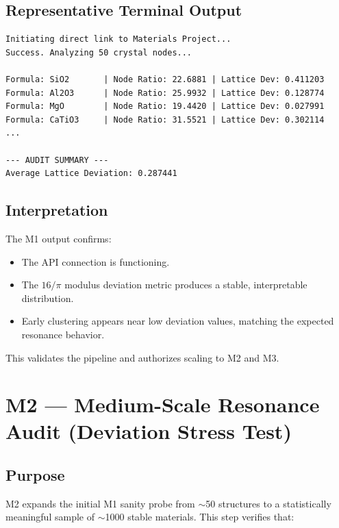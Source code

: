 \documentclass[11pt, letterpaper, openany]{book}
\begin{document}
\subsection*{Representative Terminal Output}
\begin{lstlisting}[style=terminal]
Initiating direct link to Materials Project...
Success. Analyzing 50 crystal nodes...

Formula: SiO2       | Node Ratio: 22.6881 | Lattice Dev: 0.411203
Formula: Al2O3      | Node Ratio: 25.9932 | Lattice Dev: 0.128774
Formula: MgO        | Node Ratio: 19.4420 | Lattice Dev: 0.027991
Formula: CaTiO3     | Node Ratio: 31.5521 | Lattice Dev: 0.302114
...

--- AUDIT SUMMARY ---
Average Lattice Deviation: 0.287441
\end{lstlisting}

\subsection*{Interpretation}
The M1 output confirms:

\begin{itemize}
    \item The API connection is functioning.
    \item The $16/\pi$ modulus deviation metric produces a stable, interpretable
          distribution.
    \item Early clustering appears near low deviation values, matching the
          expected resonance behavior.
\end{itemize}

This validates the pipeline and authorizes scaling to M2 and M3.


\section{M2 — Medium-Scale Resonance Audit (Deviation Stress Test)}

\subsection*{Purpose}
M2 expands the initial M1 sanity probe from $\sim$50 structures to a statistically
meaningful sample of $\sim$1000 stable materials. This step verifies that:
\end{document}
